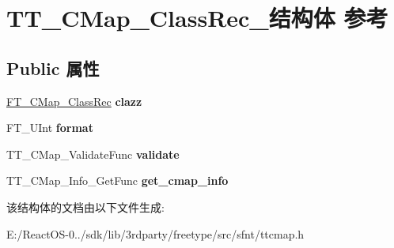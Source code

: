 \hypertarget{struct_t_t___c_map___class_rec__}{}\section{T\+T\+\_\+\+C\+Map\+\_\+\+Class\+Rec\+\_\+结构体 参考}
\label{struct_t_t___c_map___class_rec__}
\subsection*{Public 属性}
\begin{DoxyCompactItemize}
\item 
\mbox{\label{struct_t_t___c_map___class_rec___a69bc97d83ae930277add2222f7822c87}} 
\hyperlink{struct_f_t___c_map___class_rec__}{F\+T\+\_\+\+C\+Map\+\_\+\+Class\+Rec} {\bfseries clazz}
\item 
\mbox{\label{struct_t_t___c_map___class_rec___a1b45f969acb709e742b4c8087a5689eb}} 
F\+T\+\_\+\+U\+Int {\bfseries format}
\item 
\mbox{\label{struct_t_t___c_map___class_rec___a2bd8e80cd19a515febf91e1fa5ad7263}} 
T\+T\+\_\+\+C\+Map\+\_\+\+Validate\+Func {\bfseries validate}
\item 
\mbox{\label{struct_t_t___c_map___class_rec___ae11e3d3bc326ec65521b9e57c8dd7c0f}} 
T\+T\+\_\+\+C\+Map\+\_\+\+Info\+\_\+\+Get\+Func {\bfseries get\+\_\+cmap\+\_\+info}
\end{DoxyCompactItemize}


该结构体的文档由以下文件生成\+:\begin{DoxyCompactItemize}
\item 
E\+:/\+React\+O\+S-\/0../sdk/lib/3rdparty/freetype/src/sfnt/ttcmap.\+h\end{DoxyCompactItemize}
